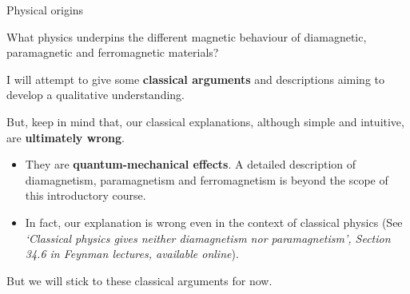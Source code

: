 %
%

\begin{frame}{Physical origins}

What physics underpins the different magnetic behaviour
of diamagnetic, paramagnetic and ferromagnetic materials?\\
\vspace{0.2cm}

I will attempt to give some {\bf classical arguments} and descriptions aiming to develop a
qualitative understanding.\\
\vspace{0.2cm}

But, keep in mind that, our classical explanations, although simple and intuitive,
are {\bf ultimately wrong}.

\begin{itemize}
  \item
    They are {\bf quantum-mechanical effects}.
    A detailed description of diamagnetism, paramagnetism and ferromagnetism
    is beyond the scope of this introductory course.
  \item
    In fact, our explanation is wrong even in the context of classical physics
    (See {\it `Classical physics gives neither diamagnetism nor paramagnetism', Section 34.6 in Feynman lectures, available online}).
\end{itemize}

But we will stick to these classical arguments for now.

\end{frame}

%
%
%

